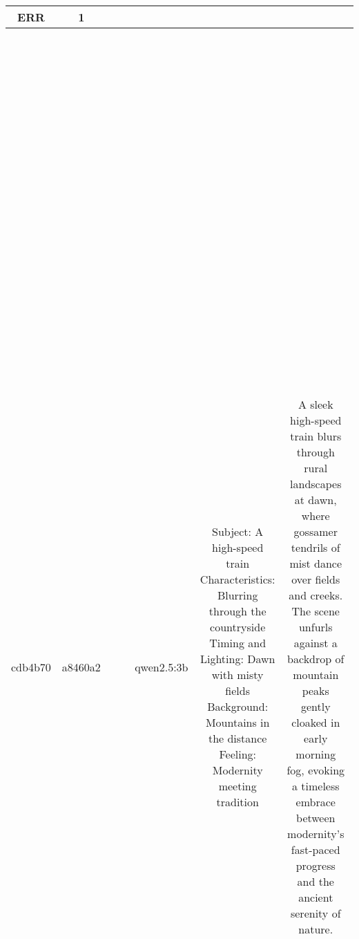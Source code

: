 \begin{table}[h!]
\begin{tabular}{|c|c|c|c|c|c|c|c|c|c|}
ERR & 1\\
\hline
cdb4b70 & a8460a2 &  &  & qwen2.5:3b & Subject: A high-speed train  
Characteristics: Blurring through the countryside  
Timing and Lighting: Dawn with misty fields  
Background: Mountains in the distance  
Feeling: Modernity meeting tradition & A sleek high-speed train blurs through rural landscapes at dawn, where gossamer tendrils of mist dance over fields and creeks. The scene unfurls against a backdrop of mountain peaks gently cloaked in early morning fog, evoking a timeless embrace between modernity's fast-paced progress and the ancient serenity of nature. & ok & The chatbot's output is a single paragraph and does not exceed 80 words, adhering to the structure guideline given in the description. The output describes the subject, which is a "sleek high-speed train", along with its characteristic of blurring through rural landscapes. The timing is specified as "at dawn", and the lighting is implied with "gossamer tendrils of mist" and "early morning fog". The background is detailed with "mountain peaks gently cloaked in early morning fog", and the overall feeling evoked is of "timeless embrace between modernity's fast-paced progress and the ancient serenity of nature". The description is artistic and precise, aligning with the chatbot's expected task to create impactful AI-generated photo prompts. Thus, the output adheres to all the described guidelines.

OK & 1\\
\hline
cdb4b70 & a8460a2 &  &  & llama3.2:1b & Subject: A high-speed train  
Characteristics: Blurring through the countryside  
Timing and Lighting: Dawn with misty fields  
Background: Mountains in the distance  
Feeling: Modernity meeting tradition & To craft a captivating AI-generated photo of a high-speed train blurring through dreamy, misty fields set against majestic mountains in the background, consider the following prompt:


\end{tabular}
\end{table}
